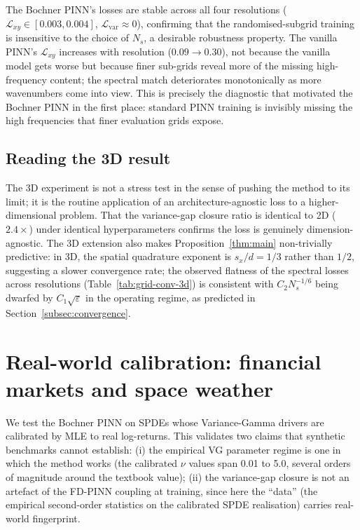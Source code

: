 \documentclass[review,12pt]{elsarticle}
\begin{document}
The Bochner PINN's losses are stable across all four resolutions
(\(\mathcal{L}_{xy} \in [0.003, 0.004]\),
\(\mathcal{L}_{\mathrm{var}} \approx 0\)), confirming that the
randomised-subgrid training is insensitive to the choice of \(N_s\),
a desirable robustness property. The vanilla PINN's
\(\mathcal{L}_{xy}\) increases with resolution (\(0.09 \to 0.30\)),
not because the vanilla model gets worse but because finer sub-grids
reveal more of the missing high-frequency content; the spectral
match deteriorates monotonically as more wavenumbers come into view.
This is precisely the diagnostic that motivated the Bochner PINN in
the first place: standard PINN training is invisibly missing the
high frequencies that finer evaluation grids expose.

\subsection{Reading the 3D result}

The 3D experiment is not a stress test in the sense of pushing the
method to its limit; it is the routine application of an
architecture-agnostic loss to a higher-dimensional problem. That the
variance-gap closure ratio is identical to 2D (\(2.4\times\)) under
identical hyperparameters confirms the loss is genuinely
dimension-agnostic. The 3D extension also makes
Proposition~\ref{thm:main} non-trivially predictive: in 3D, the
spatial quadrature exponent is \(s_x/d = 1/3\) rather than \(1/2\),
suggesting a slower convergence rate; the observed flatness of the
spectral losses across resolutions
(Table~\ref{tab:grid-conv-3d}) is consistent with \(C_2 N_s^{-1/6}\)
being dwarfed by \(C_1\sqrt\varepsilon\) in the operating regime, as
predicted in Section~\ref{subsec:convergence}.

\section{Real-world calibration: financial markets and space weather}
\label{sec:real-world}

We test the Bochner PINN on SPDEs whose Variance-Gamma drivers are
calibrated by MLE to real log-returns. This validates two claims that
synthetic benchmarks cannot establish: (i) the empirical VG
parameter regime is one in which the method works (the calibrated
\(\nu\) values span 0.01 to 5.0, several orders of magnitude around
the textbook value); (ii) the variance-gap closure is not an artefact
of the FD-PINN coupling at training, since here the ``data'' (the
empirical second-order statistics on the calibrated SPDE realisation)
carries real-world fingerprint.
\end{document}
